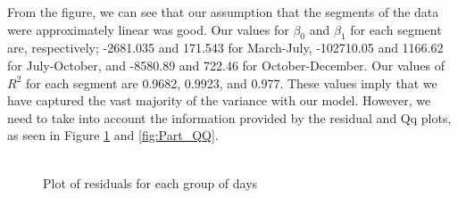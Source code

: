 \documentclass{article}
\begin{document}
From the figure, we can see that our assumption that the segments of the data were approximately linear was good. Our values for $\beta_0$ and $\beta_1$ for each segment are, respectively; -2681.035 and 171.543 for March-July, -102710.05 and 1166.62 for July-October, and -8580.89 and 722.46 for October-December. Our values of $R^2$ for each segment are 0.9682, 0.9923, and 0.977. These values imply that we have captured the vast majority of the variance with our model. However, we need to take into account the information provided by the residual and Qq plots, as seen in Figure \ref{fig:Parts_Res} and \ref{fig:Part_QQ}.\\\\
\begin{figure}[h]
\centering
{}
\caption{Plot of residuals for each group of days}
\label{fig:Parts_Res}
\end{figure}
\end{document}

